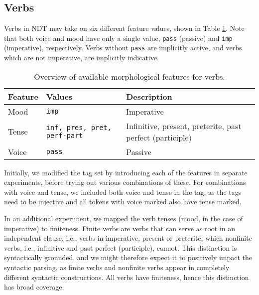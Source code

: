 \documentclass[a4paper,12pt,english]{book}
\begin{document}
\subsection{Verbs}
Verbs in NDT may take on six different feature values, shown in Table
\ref{verbfeatures}. Note that both voice and mood have only a single value,
\texttt{pass} (passive) and \texttt{imp} (imperative), respectively. Verbs
without \texttt{pass} are implicitly active, and verbs which are not
imperative, are implicitly indicative.


\begin{table}
    \centering
    \smaller[0.5]
    \begin{tabular}{@{}lp{5cm}p{5cm}@{}}
        \toprule
        \textbf{Feature} & \textbf{Values} & \textbf{Description} \\
        \midrule
        Mood & \texttt{imp} & Imperative \\
        Tense & \texttt{inf, pres, pret, perf-part} & Infinitive, present,
        preterite, past perfect (participle) \\
        Voice & \texttt{pass} & Passive \\
        \bottomrule
    \end{tabular}
    \caption{Overview of available morphological features for verbs.}
    \label{verbfeatures}
\end{table}

Initially, we modified the tag set by introducing each of the features in
separate experiments, before trying out various combinations of these. For
combinations with voice and tense, we included both voice and tense in the tag,
as the tags need to be injective and all tokens with voice marked also have
tense marked.


In an additional experiment, we mapped the verb tenses (mood, in the case of
imperative) to finiteness. Finite verbs are verbs that can serve as root in an
independent clause, i.e., verbs in imperative, present or preterite, which
nonfinite verbs, i.e., infinitive and past perfect (participle), cannot. This
distinction is syntactically grounded, and we might therefore expect it to
positively impact the syntactic parsing, as finite verbs and nonfinite verbs
appear in completely different syntactic constructions. All verbs have
finiteness, hence this distinction has broad coverage.
\end{document}
